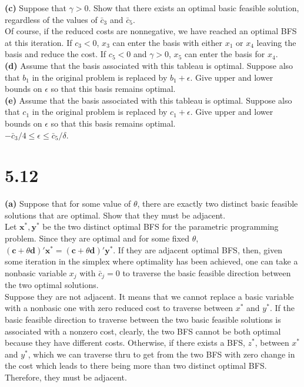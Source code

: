 \documentclass{article}
\begin{document}
\textbf{(c)} Suppose that $\gamma > 0$.  Show that there exists an optimal basic feasible solution, regardless of the values of $\bar{c}_3$ and $\bar{c}_5$.   \\

\noindent
Of course, if the reduced costs are nonnegative, we have reached an optimal BFS at this iteration.  If $c_3 < 0$, $x_3$ can enter the basis with either $x_1$ or $x_4$ leaving the basis and reduce the cost.  If $c_5 < 0$ and $\gamma > 0$, $x_5$ can enter the basis for $x_4$.  \\


\textbf{(d)}  Assume that the basis associated with this tableau is optimal.  Suppose also that $b_1$ in the original problem is replaced by $b_1 + \epsilon$.  Give upper and lower bounds on $\epsilon$ so that this basis remains optimal. \\
 
\textbf{(e)}  Assume that the basis associated with this tableau is optimal.  Suppose also that $c_1$ in the original problem is replaced by $c_1 + \epsilon$.  Give upper and lower bounds on $\epsilon$ so that this basis remains optimal. \\

\noindent $ - \bar{c}_3 / 4 \leq \epsilon \leq \bar{c}_5 / \delta$.

\section*{5.12}
\textbf{(a)}  Suppose that for some value of $\theta$, there are exactly two distinct basic feasible solutions that are optimal.  Show that they must be adjacent.  \\

\noindent
Let $ \mathbf{x^*, y^*}$ be the two distinct optimal BFS for the parametric programming problem.  Since they are optimal and for some fixed $\theta$, $(\mathbf{c} + \theta \mathbf{d})\mathbf{' x^*} = (\mathbf{c} + \theta \mathbf{d})\mathbf{' y^*}$.  If they are adjacent optimal BFS, then, given some iteration in the simplex where optimality has been achieved, one can take a nonbasic variable $x_j$ with $\bar{c}_j = 0$ to traverse the basic feasible direction between the two optimal solutions.  \\

\noindent
Suppose they are not adjacent.  It means that we cannot replace a basic variable with a nonbasic one with zero reduced cost to traverse between $x^*$ and $y^*$.  If the basic feasible direction to traverse between the two basic feasible solutions is associated with a nonzero cost, clearly, the two BFS cannot be both optimal because they have different costs.  Otherwise,  if there exists a BFS, $z^*$, between $x^*$ and $y^*$, which we can traverse thru to get from the two BFS with zero change in the cost which leads to there being more than two distinct optimal BFS.  Therefore, they must be adjacent.
\end{document}
